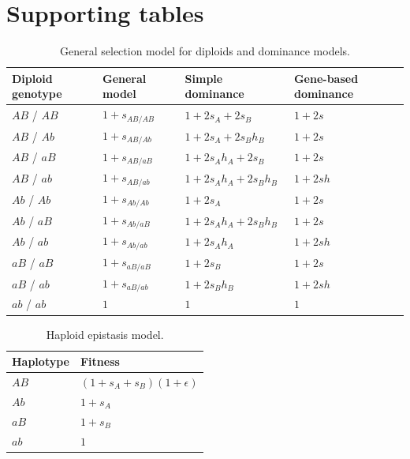 \documentclass[]{article}
\begin{document}



\clearpage
\newpage

\section{Supporting tables}

\begin{table}[ht!]
    \centering
    \begin{tabular}{llll}
        \toprule
        Diploid genotype & General model & Simple dominance & Gene-based dominance\\
        \midrule
        $AB$ / $AB$ & $1 + s_{AB/AB}$ & $1 + 2s_A + 2s_B$ & $1 + 2s$\\
        $AB$ / $Ab$ & $1 + s_{AB/Ab}$ & $1 + 2s_A + 2s_Bh_B$ & $1 + 2s$\\
        $AB$ / $aB$ & $1 + s_{AB/aB}$ & $1 + 2s_Ah_A + 2s_B$ & $1 + 2s$\\
        $AB$ / $ab$ & $1 + s_{AB/ab}$ & $1 + 2s_Ah_A + 2s_Bh_B$ & $1 + 2sh$\\
        $Ab$ / $Ab$ & $1 + s_{Ab/Ab}$ & $1 + 2s_A$ & $1 + 2s$\\
        \addlinespace
        $Ab$ / $aB$ & $1 + s_{Ab/aB}$ & $1 + 2s_Ah_A + 2s_Bh_B$ & $1 + 2s$\\
        $Ab$ / $ab$ & $1 + s_{Ab/ab}$ & $1 + 2s_Ah_A$ & $1 + 2sh$\\
        $aB$ / $aB$ & $1 + s_{aB/aB}$ & $1 + 2s_B$ & $1 + 2s$\\
        $aB$ / $ab$ & $1 + s_{aB/ab}$ & $1 + 2s_Bh_B$ & $1 + 2sh$\\
        $ab$ / $ab$ & $1$ & $1$ & $1$\\
        \bottomrule
    \end{tabular}
    \caption{General selection model for diploids and dominance models.}
    \label{tab:selmodels}
\end{table}


\begin{table}[ht!]
    \centering
    \begin{tabular}{ll}
        \toprule
        Haplotype & Fitness\\
        \midrule
        $AB$ & $(1 + s_A + s_B)(1+\epsilon)$\\
        $Ab$ & $1 + s_A$\\
        $aB$ & $1 + s_B$\\
        $ab$ & $1$\\
        \bottomrule
    \end{tabular}
    \caption{Haploid epistasis model.}
    \label{tab:epistasis}
\end{table}
\end{document}
